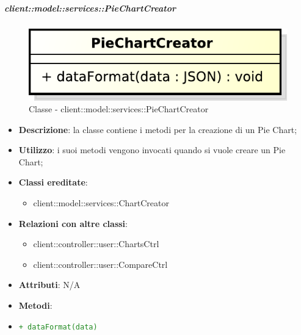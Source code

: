 		\subparagraph{client::model::services::PieChartCreator} %
		\label{subp:piechartcreator}
			\begin{figure}[htbp]
				\centering
				\centerline{\includegraphics[scale=0.7]{./images/client/classes/model/pie_chart_creator.pdf}}
				\caption{Classe - client::model::services::PieChartCreator}
			\end{figure}
			\begin{itemize}
				\item \textbf{Descrizione}: la classe contiene i metodi per la creazione di un Pie Chart;
				\item \textbf{Utilizzo}: i suoi metodi vengono invocati quando si vuole creare un Pie Chart;
				\item \textbf{Classi ereditate}:
					\begin{itemize}
						\item client::model::services::ChartCreator
					\end{itemize}
				\item \textbf{Relazioni con altre classi}:
					\begin{itemize}
						\item client::controller::user::ChartsCtrl
						\item client::controller::user::CompareCtrl
					\end{itemize}
				\item \textbf{Attributi}: N/A
				\item \textbf{Metodi}: 
					\item \textcolor{forestgreen}{\texttt{+ dataFormat(data)}}
			\end{itemize}

